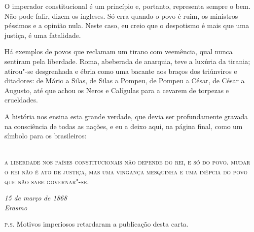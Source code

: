  O imperador constitucional é um princípio e, portanto, representa
sempre o bem. Não pode falir, dizem os ingleses. Só erra quando o povo
é ruim, os ministros péssimos e a opinião nula. Neste caso, eu creio
que o despotismo é mais que uma justiça, é uma fatalidade.

 Há exemplos de povos que reclamam um tirano com veemência, qual nunca
sentiram pela liberdade. Roma, abeberada de anarquia, teve a luxúria da
tirania; atirou"-se desgrenhada e ébria como uma bacante aos braços
dos triúnviros e ditadores: de Mário a Silas, de Silas a Pompeu, de
Pompeu a César, de César a Augusto, até que achou os Neros e Calígulas
para a cevarem de torpezas e crueldades.

 A história nos ensina esta grande verdade, que devia ser profundamente
gravada na consciência de todas as nações, e eu a deixo aqui, na página
final, como um símbolo para os brasileiros:\\\ 

\textsc{a liberdade nos países constitucionais não depende do rei, e só do
povo. mudar o rei não é ato de justiça, mas uma vingança mesquinha e
uma inépcia do povo que não sabe governar"-se.}

\begin{flushright}
\textit{15 de março de 1868\\
Erasmo}
\end{flushright}
 

\noindent\textsc{p.s.} Motivos imperiosos retardaram a publicação desta carta.  




